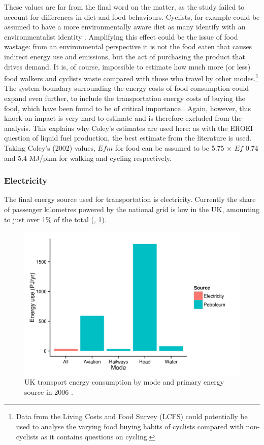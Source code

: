 These values are far from the final word on the matter, as the study failed
to account for differences in diet and food behaviours.
Cyclists, for example could be assumed
to have a more environmentally aware diet as many identify with an environmentalist
identity \citep{Gatersleben2007}. Amplifying this effect could be the issue of
food wastage: from an environmental perspective it is not the food eaten
that causes indirect energy use and emissions, but the act of purchasing the
product that drives demand. It is, of course, impossible to estimate how much more
(or less) food walkers and cyclists waste compared with those who travel by other
modes.\footnote{Data
from the Living Costs and Food Survey (LCFS) could potentially be used to
analyse the varying food buying habits of cyclists compared with non-cyclists
as it contains questions on cycling.
}
The system boundary surrounding the energy costs of food consumption could
expand even further, to include the transportation energy costs of buying the
food, which have been found to be of critical importance \citep{Coley2009}.
Again, however, this
knock-on impact is very hard to estimate and is therefore excluded from the analysis.
This explains why Coley's estimates are used here: as with the EROEI question of
liquid fuel production, the best estimate from the literature is used.
Taking Coley's (2002) values, $Efm$ for food can be assumed to be 5.75 $\times$
$Ef$ 0.74 and 5.4 MJ/pkm for walking and cycling respectively. 

\subsubsection{Electricity} 
The final energy source used for transportation is electricity. Currently the
share of passenger kilometres powered by the national grid is low in the UK,
amounting to just over 1\% of the total (\citealp[p.~104, table
18.3]{MacKay2009}, \cref{fdirecten}).

\begin{figure}[t]
 \begin{center}
 \includegraphics[width=12 cm]{direct-en}
\end{center}
 \caption[UK transport energy consumption by mode and energy source]{UK transport energy consumption by mode and primary energy source in
2006 \citep[p.~104]{MacKay2009}.}
 \label{fdirecten}
\end{figure}

